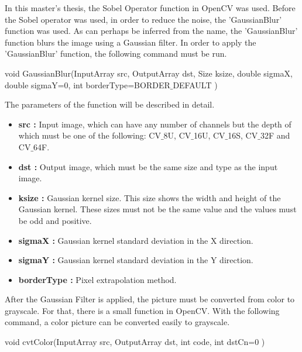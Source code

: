 In this master's thesis, the Sobel Operator function in OpenCV was used. Before the Sobel operator was used, in order to reduce the noise, the 'GaussianBlur' function was used. As can perhaps be inferred from the name, the 'GaussianBlur' function blurs the image using a Gaussian filter. In order to apply the 'GaussianBlur' function, the following command must be run.

 \begin{center}
  
void GaussianBlur(InputArray src, OutputArray dst, Size ksize, double sigmaX, double sigmaY=0, int borderType=BORDER$\_$DEFAULT )

  \end{center}

The parameters of the function will be described in detail.\cite{GaussianBlur}
 
\begin{itemize}

\item \textbf{src : }Input image, which can have any number of channels but the depth of which must be one of the following: CV$\_$8U, CV$\_$16U, CV$\_$16S, CV$\_$32F and CV$\_$64F.
 
\item \textbf{dst : }Output image, which must be the same size and type as the input image.

\item \textbf{ksize : }Gaussian kernel size. This size shows the width and height of the Gaussian kernel. These sizes must not be the same value and the values must be odd and positive.

\item \textbf{sigmaX : }Gaussian kernel standard deviation in the X direction.

\item \textbf{sigmaY : }Gaussian kernel standard deviation in the Y direction.

\item \textbf{borderType : }Pixel extrapolation method.

\end{itemize}

After the Gaussian Filter is applied, the picture must be converted from color to grayscale. For that, there is a small function in OpenCV. With the following command, a color picture can be converted easily to grayscale.

 \begin{center}
 
void cvtColor(InputArray src, OutputArray dst, int code, int dstCn=0 )

 \end{center}
 
